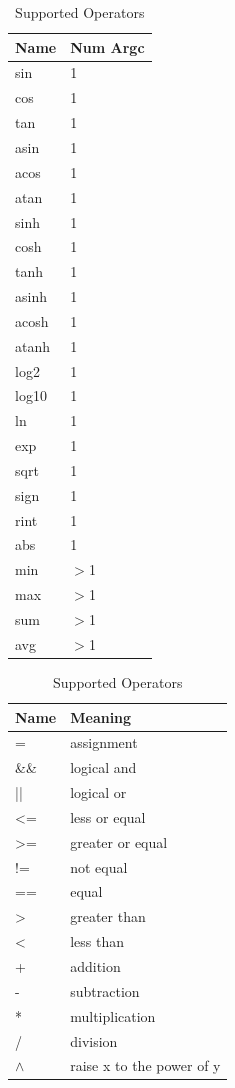 \begin{table}
\parbox{.45\linewidth}
{
	\centering
	\begin{tabular}{ | l | l |}
	\hline
   Name & Num Argc \\ \hline    
    sin&1 \\ \hline
    cos&1 \\ \hline
    tan&1 \\ \hline
    asin&1 \\ \hline
    acos&1 \\ \hline
    atan&1 \\ \hline
    sinh&1 \\ \hline
    cosh&1 \\ \hline
    tanh&1 \\ \hline
    asinh&1 \\ \hline
    acosh&1 \\ \hline
    atanh&1 \\ \hline
    log2&1 \\ \hline
    log10&1 \\ \hline
    ln&1 \\ \hline
    exp&1 \\ \hline
    sqrt&1 \\ \hline
    sign&1 \\ \hline
    rint&1 \\ \hline
    abs&1 \\ \hline
    min&$>$1 \\ \hline
    max&$>$1 \\ \hline
    sum&$>$1 \\ \hline
    avg&$>$1 \\ \hline
   \end{tabular}
   \caption{Supported Functions}
   \label{tab:builtinfcntable}
   }
\hfill
\parbox{.45\linewidth}
{
	\centering
	\begin{tabular}{ | l | l |}
	\hline
    Name & Meaning \\ \hline    
    =&assignment \\ \hline
    \&\&&logical and \\ \hline
    ||&logical or \\ \hline
    <=&less or equal \\ \hline
    >=&greater or equal \\ \hline
    !=&not equal \\ \hline
    ==&equal \\ \hline
    >&greater than \\ \hline
    <&less than \\ \hline
    +&addition \\ \hline
    -&subtraction \\ \hline
    *&multiplication \\ \hline
    /&division \\ \hline
    $\wedge$&raise x to the power of y \\ \hline
  \end{tabular}
  \caption{Supported Operators}
  \label{tab:optable}
  }
\end{table}

